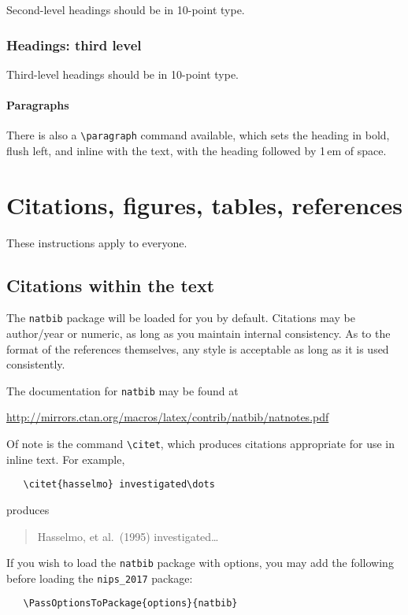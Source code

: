 \documentclass{article}
\begin{document}
Second-level headings should be in 10-point type.

\subsubsection{Headings: third level}

Third-level headings should be in 10-point type.

\paragraph{Paragraphs}

There is also a \verb+\paragraph+ command available, which sets the
heading in bold, flush left, and inline with the text, with the
heading followed by 1\,em of space.

\section{Citations, figures, tables, references}
\label{others}

These instructions apply to everyone.

\subsection{Citations within the text}

The \verb+natbib+ package will be loaded for you by default.
Citations may be author/year or numeric, as long as you maintain
internal consistency.  As to the format of the references themselves,
any style is acceptable as long as it is used consistently.

The documentation for \verb+natbib+ may be found at
\begin{center}
  \url{http://mirrors.ctan.org/macros/latex/contrib/natbib/natnotes.pdf}
\end{center}
Of note is the command \verb+\citet+, which produces citations
appropriate for use in inline text.  For example,
\begin{verbatim}
   \citet{hasselmo} investigated\dots
\end{verbatim}
produces
\begin{quote}
  Hasselmo, et al.\ (1995) investigated\dots
\end{quote}

If you wish to load the \verb+natbib+ package with options, you may
add the following before loading the \verb+nips_2017+ package:
\begin{verbatim}
   \PassOptionsToPackage{options}{natbib}
\end{verbatim}
\end{document}
